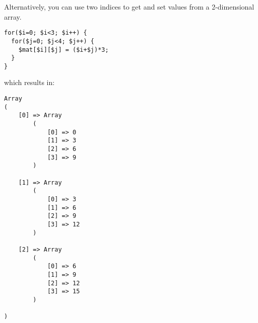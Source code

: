 Alternatively, you can use two indices to get and set values 
from a 2-dimensional array.

\begin{verbatim}
for($i=0; $i<3; $i++) {
  for($j=0; $j<4; $j++) {
    $mat[$i][$j] = ($i+$j)*3;
  }
}
\end{verbatim}

which results in:

\begin{verbatim}
Array
(
    [0] => Array
        (
            [0] => 0
            [1] => 3
            [2] => 6
            [3] => 9
        )

    [1] => Array
        (
            [0] => 3
            [1] => 6
            [2] => 9
            [3] => 12
        )

    [2] => Array
        (
            [0] => 6
            [1] => 9
            [2] => 12
            [3] => 15
        )

)
\end{verbatim}

